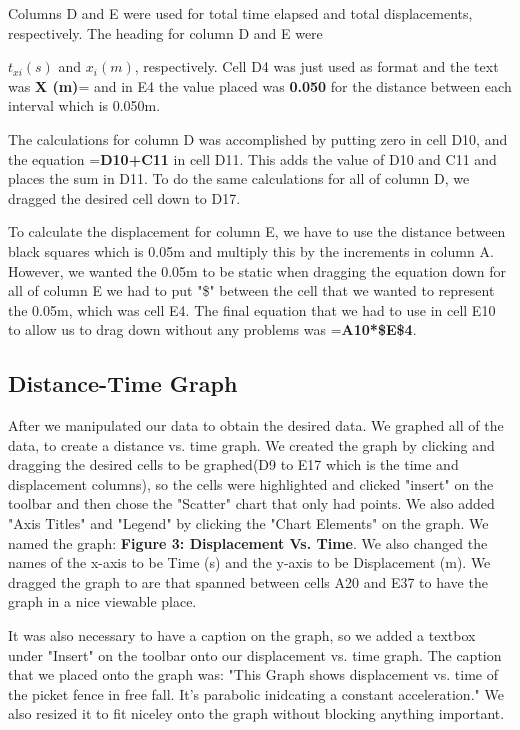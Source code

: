 \documentclass[aps,letterpaper,11pt]{revtex4}
\begin{document}
Columns D and E were used for total time elapsed and total displacements, respectively. The heading for column D and E were {$t_{xi} (s)$ and $x_i (m)$, respectively. Cell D4 was just used as format and the text was \textbf{X (m)}= and in E4 the value placed was \textbf{0.050} for the distance between each interval which is 0.050m. 

The calculations for column D was accomplished by putting zero in cell D10, and the equation =\textbf{D10+C11} in cell D11. This adds the value of D10 and C11 and places the sum in D11. To do the same calculations for all of column D, we dragged the desired cell down to D17. 

To calculate the displacement for column E, we have to use the distance between black squares which is 0.05m and multiply this by the increments in column A. However, we wanted the 0.05m to be static when dragging the equation down for all of column E we had to put "\$" between the cell that we wanted to represent the 0.05m, which was cell E4. The final equation that we had to use in cell E10 to allow us to drag down without any problems was =\textbf{A10*\$E\$4}. 

\subsection{Distance-Time Graph}

After we manipulated our data to obtain the desired data. We graphed all of the data, to create a distance vs. time graph. We created the graph by clicking and dragging the desired cells to be graphed(D9 to E17 which is the time and displacement columns), so the cells were highlighted and clicked "insert" on the toolbar and then chose the "Scatter" chart that only had points. We also added "Axis Titles" and "Legend" by clicking the "Chart Elements" on the graph. We named the graph: \textbf{Figure 3: Displacement Vs. Time}. We also changed the names of the x-axis to be Time (s) and the y-axis to be Displacement (m). We dragged the graph to are that spanned between cells A20 and E37 to have the graph in a nice viewable place. 

It was also necessary to have a caption on the graph, so we added a textbox under "Insert" on the toolbar onto our displacement vs. time graph. The caption that we placed onto the graph was: "This Graph shows displacement vs. time of the picket fence in free fall. It's parabolic inidcating a constant acceleration." We also resized it to fit niceley onto the graph without blocking anything important.  

}
\end{document}
